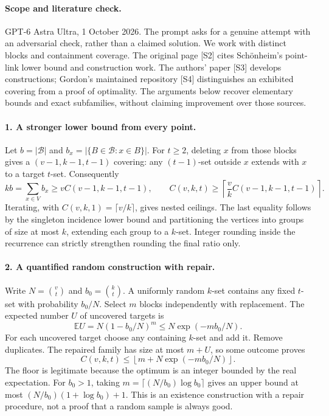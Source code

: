 \documentclass[11pt,a4paper]{article}
\begin{document}
\paragraph{Scope and literature check.}
GPT-6 Astra Ultra, 1 October 2026. The prompt asks for a genuine attempt
with an adversarial check, rather than a claimed solution. We work with
distinct blocks and containment coverage. The original page [S2] cites
Schönheim's point-link lower bound and construction work. The authors'
paper [S3] develops constructions; Gordon's maintained repository [S4]
distinguishes an exhibited covering from a proof of optimality. The
arguments below recover elementary bounds and exact subfamilies, without
claiming improvement over those sources.

\paragraph{1. A stronger lower bound from every point.}
Let $b=|\mathcal B|$ and $b_x=|\{B\in\mathcal B:x\in B\}|$.
For $t\ge2$, deleting $x$ from those blocks gives a
$(v-1,k-1,t-1)$ covering: any $(t-1)$-set outside $x$ extends with $x$
to a target $t$-set. Consequently
\[
 kb=\sum_{x\in V}b_x\ge v C(v-1,k-1,t-1),\qquad
 C(v,k,t)\ge\left\lceil\frac vk C(v-1,k-1,t-1)\right\rceil.
\]
Iterating, with $C(v,k,1)=\lceil v/k\rceil$, gives nested ceilings.
The last equality follows by the singleton incidence lower bound and
partitioning the vertices into groups of size at most $k$, extending
each group to a $k$-set. Integer rounding inside the recurrence can
strictly strengthen rounding the final ratio only.

\paragraph{2. A quantified random construction with repair.}
Write $N=\binom vt$ and $b_0=\binom kt$. A uniformly random $k$-set
contains any fixed $t$-set with probability $b_0/N$. Select $m$ blocks
independently with replacement. The expected number $U$ of uncovered
targets is
\[
 \mathbb E U=N(1-b_0/N)^m\le N\exp(-mb_0/N).
\]
For each uncovered target choose any containing $k$-set and add it.
Remove duplicates. The repaired family has size at most $m+U$, so
some outcome proves
\[
 C(v,k,t)\le\left\lfloor m+N\exp(-mb_0/N)\right\rfloor.
\]
The floor is legitimate because the optimum is an integer bounded by
the real expectation. For $b_0>1$, taking
$m=\lceil (N/b_0)\log b_0\rceil$ gives an upper bound at most
$(N/b_0)(1+\log b_0)+1$. This is an existence construction with a
repair procedure, not a proof that a random sample is always good.
\end{document}
